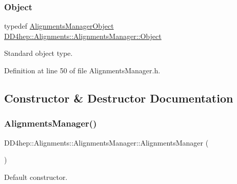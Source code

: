 \subsubsection{\texorpdfstring{Object}{Object}}
{\footnotesize\ttfamily typedef \hyperlink{class_d_d4hep_1_1_alignments_1_1_alignments_manager_object}{Alignments\+Manager\+Object} \hyperlink{class_d_d4hep_1_1_alignments_1_1_alignments_manager_a45f94880f4e49efe8e77ce6d8e45275f}{D\+D4hep\+::\+Alignments\+::\+Alignments\+Manager\+::\+Object}}



Standard object type. 



Definition at line 50 of file Alignments\+Manager.\+h.



\subsection{Constructor \& Destructor Documentation}
\hypertarget{class_d_d4hep_1_1_alignments_1_1_alignments_manager_aa1130b17ef8438d29172adb85c40f159}{}\label{class_d_d4hep_1_1_alignments_1_1_alignments_manager_aa1130b17ef8438d29172adb85c40f159} 
\subsubsection{\texorpdfstring{Alignments\+Manager()}{AlignmentsManager()}\hspace{0.1cm}{\footnotesize\ttfamily [1/6]}}
{\footnotesize\ttfamily D\+D4hep\+::\+Alignments\+::\+Alignments\+Manager\+::\+Alignments\+Manager (\begin{DoxyParamCaption}{ }\end{DoxyParamCaption})\hspace{0.3cm}{\ttfamily [default]}}



Default constructor. 

\hypertarget{class_d_d4hep_1_1_alignments_1_1_alignments_manager_a14ef021c09811b2a436b705369b42b43}{}\label{class_d_d4hep_1_1_alignments_1_1_alignments_manager_a14ef021c09811b2a436b705369b42b43} 
